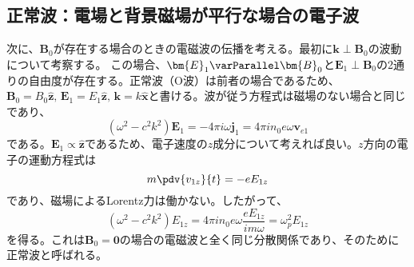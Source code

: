 \subsection{正常波：電場と背景磁場が平行な場合の電子波}
次に、$\bm{B}_0$が存在する場合のときの電磁波の伝播を考える。最初に$\bm{k}\perp\bm{B}_0$の波動について考察する。
この場合、$\bm{E}_1\varParallel \bm{B}_0$と$\bm{E}_1\perp \bm{B}_0$の2通りの自由度が存在する。正常波（O波）は前者の場合であるため、
$\bm{B}_0 = B_0\hat{\bm{z}},\,\bm{E}_1 = E_1\hat{\bm{z}},\,\bm{k} = k\hat{\bm{x}}$と書ける。波が従う方程式は磁場のない場合と同じであり、
\begin{equation}
	(\omega^2-c^2k^2)\bm{E}_1 = -4\pi{}i\omega{}\bm{j}_1 = 4\pi{}in_0e\omega\bm{v}_{e1}
\end{equation}
である。$\bm{E}_1 \propto\hat{\bm{z}}$であるため、電子速度の$z$成分について考えれば良い。$z$方向の電子の運動方程式は
\begin{equation}
	m\pdv{v_{1z}}{t} = -eE_{1z}
\end{equation}
であり、磁場によるLorentz力は働かない。したがって、
\begin{equation}
	(\omega^2 - c^2k^2)E_{1z} = 4\pi{}in_0e\omega\frac{eE_{1z}}{im\omega} = \omega^2_pE_{1z}
\end{equation}
を得る。これは$\bm{B}_0 = \bm{0}$の場合の電磁波と全く同じ分散関係であり、そのために正常波と呼ばれる。

